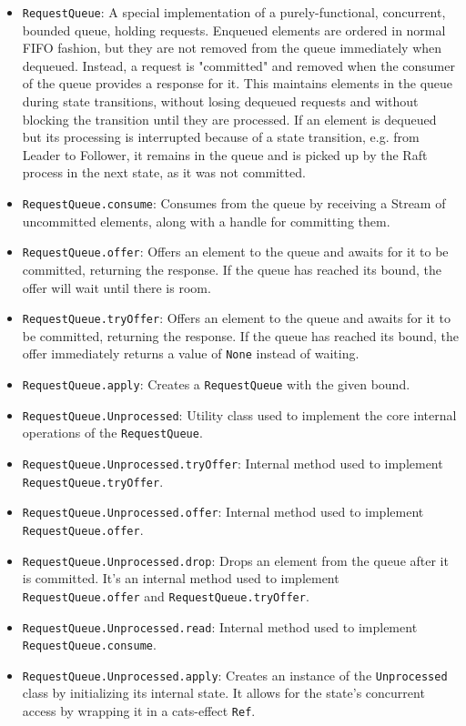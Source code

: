 \begin{itemize}
    \item \lstinline|RequestQueue|: A special implementation of a purely-functional, concurrent, bounded queue, holding requests. Enqueued elements are ordered in normal FIFO fashion, but they are not removed from the queue immediately when dequeued. Instead, a request is "committed" and removed when the consumer of the queue provides a response for it. This maintains elements in the queue during state transitions, without losing dequeued requests and without blocking the transition until they are processed. If an element is dequeued but its processing is interrupted because of a state transition, e.g. from Leader to Follower, it remains in the queue and is picked up by the Raft process in the next state, as it was not committed.
    \item \lstinline|RequestQueue.consume|: Consumes from the queue by receiving a Stream of uncommitted elements, along with a handle for committing them.
    \item \lstinline|RequestQueue.offer|: Offers an element to the queue and awaits for it to be committed, returning the response. If the queue has reached its bound, the offer will wait until there is room.
    \item \lstinline|RequestQueue.tryOffer|: Offers an element to the queue and awaits for it to be committed, returning the response. If the queue has reached its bound, the offer immediately returns a value of \lstinline|None| instead of waiting.
    \item \lstinline|RequestQueue.apply|: Creates a \lstinline|RequestQueue| with the given bound.
    \item \lstinline|RequestQueue.Unprocessed|: Utility class used to implement the core internal operations of the \lstinline|RequestQueue|.
    \item \lstinline|RequestQueue.Unprocessed.tryOffer|: Internal method used to implement \lstinline|RequestQueue.tryOffer|.
    \item \lstinline|RequestQueue.Unprocessed.offer|: Internal method used to implement \lstinline|RequestQueue.offer|.
    \item \lstinline|RequestQueue.Unprocessed.drop|: Drops an element from the queue after it is committed. It's an internal method used to implement \lstinline|RequestQueue.offer| and \lstinline|RequestQueue.tryOffer|.
    \item \lstinline|RequestQueue.Unprocessed.read|: Internal method used to implement \lstinline|RequestQueue.consume|.
    \item \lstinline|RequestQueue.Unprocessed.apply|: Creates an instance of the \lstinline|Unprocessed| class by initializing its internal state. It allows for the state's concurrent access by wrapping it in a cats-effect \lstinline|Ref|.

\end{itemize}
